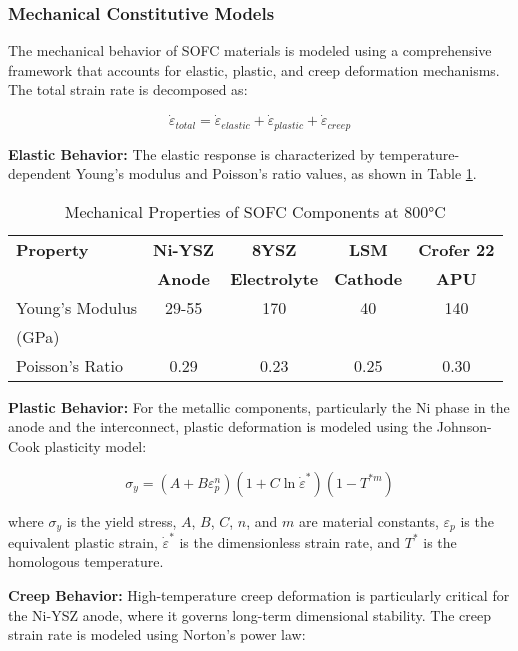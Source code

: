 \documentclass[conference]{IEEEtran}
\begin{document}
\subsubsection{Mechanical Constitutive Models}

The mechanical behavior of SOFC materials is modeled using a comprehensive framework that accounts for elastic, plastic, and creep deformation mechanisms. The total strain rate is decomposed as:

\begin{equation}
\dot{\varepsilon}_{total} = \dot{\varepsilon}_{elastic} + \dot{\varepsilon}_{plastic} + \dot{\varepsilon}_{creep}
\end{equation}

\textbf{Elastic Behavior:} The elastic response is characterized by temperature-dependent Young's modulus and Poisson's ratio values, as shown in Table \ref{tab:mechanical}.

\begin{table}[H]
\centering
\caption{Mechanical Properties of SOFC Components at 800°C}
\label{tab:mechanical}
\begin{tabular}{@{}lcccc@{}}
\toprule
\textbf{Property} & \textbf{Ni-YSZ} & \textbf{8YSZ} & \textbf{LSM} & \textbf{Crofer 22} \\
 & \textbf{Anode} & \textbf{Electrolyte} & \textbf{Cathode} & \textbf{APU} \\
\midrule
Young's Modulus & 29-55 & 170 & 40 & 140 \\
(GPa) & & & & \\
Poisson's Ratio & 0.29 & 0.23 & 0.25 & 0.30 \\
\bottomrule
\end{tabular}
\end{table}

\textbf{Plastic Behavior:} For the metallic components, particularly the Ni phase in the anode and the interconnect, plastic deformation is modeled using the Johnson-Cook plasticity model:

\begin{equation}
\sigma_y = (A + B\varepsilon_p^n)(1 + C\ln\dot{\varepsilon}^*)(1 - T^{*m})
\end{equation}

where $\sigma_y$ is the yield stress, $A$, $B$, $C$, $n$, and $m$ are material constants, $\varepsilon_p$ is the equivalent plastic strain, $\dot{\varepsilon}^*$ is the dimensionless strain rate, and $T^*$ is the homologous temperature.

\textbf{Creep Behavior:} High-temperature creep deformation is particularly critical for the Ni-YSZ anode, where it governs long-term dimensional stability. The creep strain rate is modeled using Norton's power law:
\end{document}
